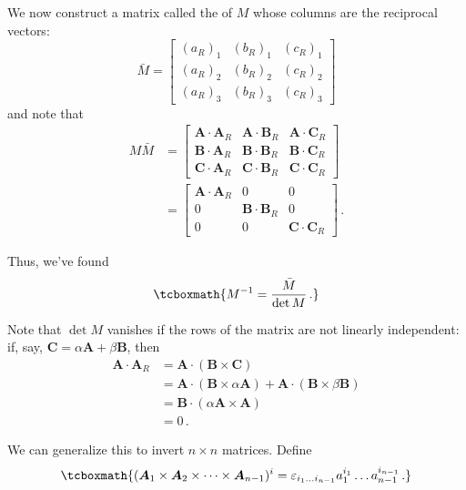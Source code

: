 We now construct a matrix called the  of $M$ whose columns are the reciprocal vectors:
\begin{equation*}
    \bar{M} = 
    \begin{bmatrix}
    (a_R)_1 & (b_R)_1 & (c_R)_1 \\
    (a_R)_2 & (b_R)_2 & (c_R)_2 \\
    (a_R)_3 & (b_R)_3 & (c_R)_3
    \end{bmatrix}
\end{equation*}
and note that 
\begin{align}
    M \bar{M} &= 
    \begin{bmatrix}
    \bm{A} \cdot \bm{A}_R & \bm{A} \cdot \bm{B}_R & \bm{A} \cdot \bm{C}_R \\
    \bm{B} \cdot \bm{A}_R & \bm{B} \cdot \bm{B}_R & \bm{B} \cdot \bm{C}_R \\
    \bm{C} \cdot \bm{A}_R & \bm{C} \cdot \bm{B}_R & \bm{C} \cdot \bm{C}_R
    \end{bmatrix} \\
    &=
    \begin{bmatrix}
    \bm{A} \cdot \bm{A}_R & 0 & 0 \\
    0 & \bm{B} \cdot \bm{B}_R & 0 \\
    0 & 0 & \bm{C} \cdot \bm{C}_R
    \end{bmatrix}\,. \nonumber
\end{align}

Thus, we've found
\begin{equation}\label{matrix inverse}
    \tcboxmath{M^{-1} = \frac{\bar{M}}{\det M}\,.}
\end{equation}

Note that $\det M$ vanishes if the rows of the matrix are not linearly independent: if, say, $\bm{C} = \alpha\bm{A} + \beta\bm{B}$, then
\begin{align}
    \bm{A} \cdot \bm{A}_R &= \bm{A} \cdot (\bm{B} \times \bm{C}) \\
    &= \bm{A} \cdot (\bm{B} \times \alpha \bm{A}) + \bm{A} \cdot (\bm{B} \times \beta\bm{B}) \\
    &= \bm{B} \cdot (\alpha\bm{A} \times \bm{A}) \\
    &= 0\,.
\end{align}

We can generalize this to invert $n \times n$ matrices. Define
\begin{equation}\label{cross product generalization}
    \tcboxmath{(\bm{A}_1 \times \bm{A}_2 \times \cdots \times \bm{A}_{n - 1})^i = \varepsilon_{i_1 \dots i_{n-1}} a_1^{i_1} \dots a_{n - 1}^{i_{n - 1}}\,.}
\end{equation}

